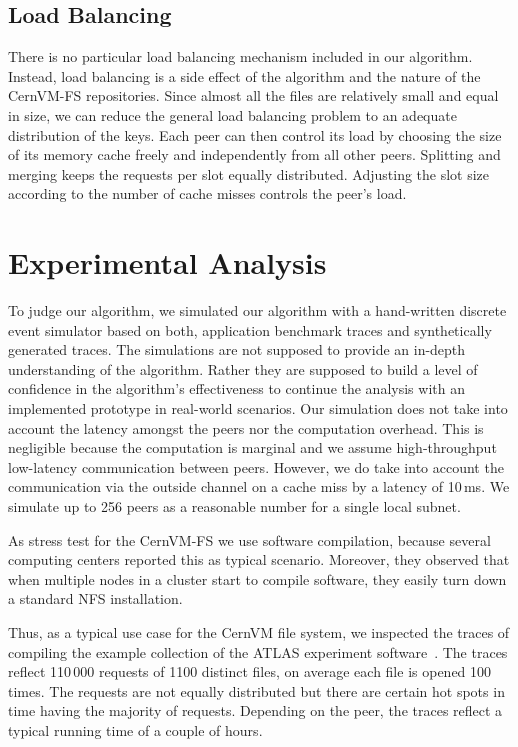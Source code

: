 \subsection{Load Balancing}
There is no particular load balancing mechanism included in our algorithm.
Instead, load balancing is a side effect of the algorithm and the nature of the CernVM-FS repositories.
Since almost all the files are relatively small and equal in size, 
we can reduce the general load balancing problem to an adequate distribution of the keys.
Each peer can then control its load by choosing the size of its memory cache freely and independently from all other peers.
Splitting and merging keeps the requests per slot equally distributed. 
Adjusting the slot size according to the number of cache misses controls the peer's load.

\section{Experimental Analysis}
\label{sec:simulation}
To judge our algorithm, we simulated our algorithm with a hand-written discrete event simulator based on both, application benchmark traces and synthetically generated traces.
The simulations are not supposed to provide an in-depth understanding of the algorithm.
Rather they are supposed to build a level of confidence in the algorithm's effectiveness to continue the analysis with an implemented prototype in real-world scenarios.
Our simulation does not take into account the latency amongst the peers nor the computation overhead.
This is negligible because the computation is marginal and we assume high-throughput low-latency communication between peers.
However, we do take into account the communication via the outside channel on a cache miss by a latency of 10\,ms.
We simulate up to 256 peers as a reasonable number for a single local subnet.

As stress test for the CernVM-FS we use software compilation, 
because several computing centers reported this as typical scenario.
Moreover, they observed that when multiple nodes in a cluster start to compile software, they easily turn down a standard NFS installation.

Thus, as a typical use case for the CernVM file system, we inspected the traces of compiling the example collection of the ATLAS experiment software~\cite{atlas05}.
The traces reflect 110\,000 requests of 1100 distinct files, \ie on average each file is opened 100 times.
The requests are not equally distributed but there are certain hot spots in time having the majority of requests.
Depending on the peer, the traces reflect a typical running time of a couple of hours.

